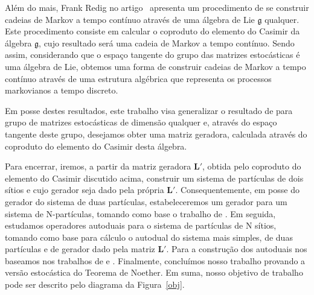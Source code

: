 \documentclass[twoside,openright,titlepage,numbers=noenddot,headinclude,  lineheaders footinclude=true,cleardoublepage=empty,
                                BCOR=5mm,paper=a4,fontsize=12pt ]{scrbook}
\theoremstyle{definition}
\begin{document}
Além do mais, Frank Redig no artigo~\cite{paper2} apresenta um procedimento de se construir
cadeias de Markov a tempo contínuo através de uma álgebra de Lie $\mathfrak{g}$ qualquer. Este procedimento consiste em
calcular o coproduto do elemento do Casimir da álgebra $\mathfrak{g}$, cujo resultado será uma cadeia de Markov a tempo contínuo.
Sendo assim, considerando que o espaço tangente do grupo das matrizes estocásticas é uma
álgebra de Lie, obtemos uma forma de construir cadeias de Markov a tempo contínuo através de uma 
estrutura algébrica que representa os processos markovianos a tempo discreto. 

Em posse destes resultados, este trabalho visa generalizar o resultado de \cite{paper1}
para grupo de matrizes estocásticas de dimensão qualquer e, através do espaço tangente deste grupo,
desejamos obter uma matriz geradora, calculada através do coproduto do
elemento do Casimir desta álgebra.

Para encerrar, iremos, a partir da matriz geradora $\bm{L}'$, obtida pelo coproduto do elemento do Casimir
discutido acima,
construir um sistema de partículas de dois sítios e cujo gerador seja dado pela própria $\bm{L}'$. 
Consequentemente, em posse do gerador do sistema de duas partículas, estabeleceremos um gerador
para um sistema de N-partículas, tomando como base o trabalho de \cite{Nparticulas}. 
Em seguida, estudamos operadores
autoduais para o sistema de partículas de N sítios, tomando como base para cálculo o autodual do sistema mais simples,
de duas partículas e de gerador dado pela matriz $\bm{L}'$. Para a construção dos autoduais nos baseamos
nos trabalhos de \cite{daniela} e \cite{redig}. Finalmente, concluímos nosso trabalho provando a versão
estocástica do Teorema de Noether.
Em suma, nosso objetivo de trabalho pode ser descrito pelo diagrama da Figura~\ref{obj}.
\end{document}
